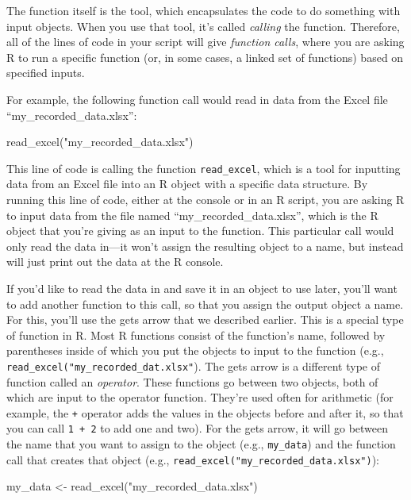 \documentclass[]{tufte-book}
\newenvironment{Shaded}{}{}
\newcommand{\FunctionTok}[1]{\textcolor[rgb]{0.02,0.16,0.49}{#1}}
\newcommand{\NormalTok}[1]{#1}
\newcommand{\OtherTok}[1]{\textcolor[rgb]{0.00,0.44,0.13}{#1}}
\newcommand{\StringTok}[1]{\textcolor[rgb]{0.25,0.44,0.63}{#1}}
\begin{document}
The function itself is the tool, which encapsulates the code to do something with
input objects. When you use that tool, it's called \emph{calling} the function. Therefore,
all of the lines of code in your script will give \emph{function calls}, where you are
asking R to run a specific function (or, in some cases, a linked set of functions)
based on specified inputs.

For example, the following function call would read in data from the Excel file
``my\_recorded\_data.xlsx'':

\begin{Shaded}
\begin{Highlighting}[]
\FunctionTok{read\_excel}\NormalTok{(}\StringTok{"my\_recorded\_data.xlsx"}\NormalTok{)}
\end{Highlighting}
\end{Shaded}

This line of code is calling the function \texttt{read\_excel}, which is a tool for inputting
data from an Excel file into an R object with a specific data structure. By running
this line of code, either at the console or in an R script, you are asking R to input
data from the file named ``my\_recorded\_data.xlsx'', which is the R object that you're
giving as an input to the function. This particular call would only read the data in---it
won't assign the resulting object to a name, but instead will just print out the data
at the R console.

If you'd like to read the data in and save it in an object to use later, you'll
want to add another function to this call, so that you assign the output object
a name. For this, you'll use the gets arrow that we described earlier. This is a
special type of function in R. Most R functions consist of the function's name,
followed by parentheses inside of which you put the objects to input to the
function (e.g., \texttt{read\_excel("my\_recorded\_dat.xlsx"}). The gets arrow is a
different type of function called an \emph{operator}. These functions go between two
objects, both of which are input to the operator function. They're used often
for arithmetic (for example, the \texttt{+} operator adds the values in the objects
before and after it, so that you can call \texttt{1\ +\ 2} to add one and two). For the
gets arrow, it will go between the name that you want to assign to the object
(e.g., \texttt{my\_data}) and the function call that creates that object (e.g.,
\texttt{read\_excel("my\_recorded\_data.xlsx")}):

\begin{Shaded}
\begin{Highlighting}[]
\NormalTok{my\_data }\OtherTok{\textless{}{-}} \FunctionTok{read\_excel}\NormalTok{(}\StringTok{"my\_recorded\_data.xlsx"}\NormalTok{)}
\end{Highlighting}
\end{Shaded}
\end{document}
